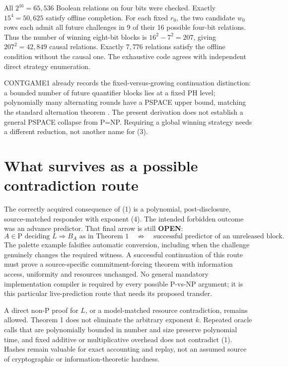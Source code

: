 \documentclass[11pt]{article}
\begin{document}
All $2^{16}=65,536$ Boolean relations on four bits were checked. Exactly
$15^4=50,625$ satisfy offline completion. For each fixed $r_0$, the two
candidate $w_0$ rows each admit all future challenges in 9 of their 16
possible four-bit relations. Thus the number of winning eight-bit blocks
is $16^2-7^2=207$, giving $207^2=42,849$ causal relations. Exactly
$7,776$ relations satisfy the offline condition without the causal one.
The exhaustive code agrees with independent direct strategy enumeration.

CONTGAME1 already records the fixed-versus-growing continuation distinction:
a bounded number of future quantifier blocks lies at a fixed PH level;
polynomially many alternating rounds have a PSPACE upper bound, matching
the standard alternation theorem \cite{cks}. The present derivation does not
establish a general PSPACE collapse from P=NP. Requiring a global winning
strategy needs a different reduction, not another name for (3).

\section{What survives as a possible contradiction route}
The correctly acquired consequence of (1) is a polynomial, post-disclosure,
source-matched responder with exponent (4). The intended forbidden outcome
was an advance predictor. That final arrow is still \textbf{OPEN}:
\[
 A\in\mathrm P\text{ deciding }L
 \Longrightarrow B_A\text{ as in Theorem 1}
 \quad\not\Longrightarrow\quad
 \text{successful predictor of an unreleased block}.    \tag{7}
\]
The palette example falsifies automatic conversion, including when the
challenge genuinely changes the required witness. A successful continuation
of this route must prove a source-specific commitment-forcing theorem with
information access, uniformity and resources unchanged. No general mandatory
implementation compiler is required by every possible P-vs-NP argument;
it is this particular live-prediction route that needs its proposed transfer.

A direct non-P proof for $L$, or a model-matched resource contradiction,
remains allowed. Theorem 1 does not eliminate the arbitrary exponent $k$.
Repeated oracle calls that are polynomially bounded in number and size
preserve polynomial time, and fixed additive or multiplicative overhead does
not contradict (1). Hashes remain valuable for exact accounting and replay,
not an assumed source of cryptographic or information-theoretic hardness.
\end{document}
